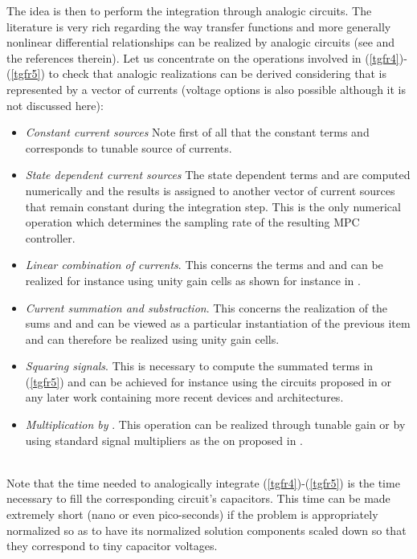 \documentclass{article}
\begin{document}
The idea is then to perform the integration through analogic circuits. The literature is very rich regarding the way transfer functions and more generally nonlinear differential relationships can be realized by analogic circuits (see \cite{Papazoglou:1997,Gunes:1997} and the references therein). Let us concentrate on the operations involved in (\ref{tgfr4})-(\ref{tgfr5}) to check that analogic realizations can be derived considering that  is represented by a vector of currents (voltage options is also possible \cite{Yuanmao:2012}  although it is not discussed here):
\begin{itemize}
\item {\em Constant current sources} Note first of all that the constant terms  and   corresponds to tunable source of currents.
\item {\em State dependent current sources} The state dependent terms  and  are computed numerically and the results is assigned to another vector of current sources that remain constant during the integration step. This is the only numerical operation which determines the sampling rate of the resulting MPC controller.
\item {\em Linear combination of currents}. This concerns the terms  and  and can be realized for instance using unity gain cells as shown for instance in \cite{Gunes:1997}.
\item {\em Current summation and substraction}. This concerns the realization of the sums  and   and can be viewed as a particular instantiation of the previous item and can therefore be realized using unity gain cells. 
\item {\em Squaring signals}. This is necessary to compute the summated terms in (\ref{tgfr5}) and can be achieved for instance using the circuits proposed in \cite{Filanovski:1992,Hidayat:2008} or any later work containing more recent devices and architectures.
\item {\em Multiplication by }. This operation can be realized through tunable gain or by using standard signal multipliers as the on proposed in \cite{Hidayat:2008}.   
\end{itemize} 
\ \\
Note that the time needed to analogically integrate (\ref{tgfr4})-(\ref{tgfr5}) is the time necessary to fill the corresponding circuit's capacitors. This time can be made extremely short (nano or even pico-seconds) if the problem is appropriately normalized so as to have its normalized solution components  scaled down so that they correspond to tiny capacitor voltages. \ \\ \ \\ 
\end{document}
